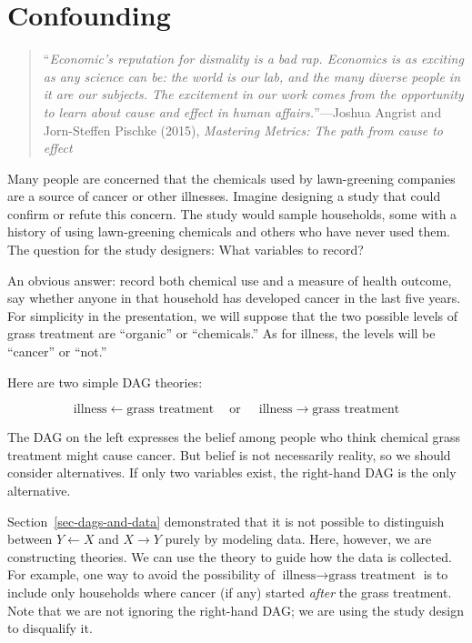 \documentclass[
  letterpaper,
  DIV=11,
  numbers=noendperiod,
  oneside]{scrartcl}
\begin{document}
\newpage

\section{Confounding}\label{sec-confounding}

\begin{quote}
``\emph{Economic's reputation for dismality is a bad rap. Economics is
as exciting as any science can be: the world is our lab, and the many
diverse people in it are our subjects. The excitement in our work comes
from the opportunity to learn about cause and effect in human
affairs.}''---Joshua Angrist and Jorn-Steffen Pischke (2015),
\emph{Mastering Metrics: The path from cause to effect}
\end{quote}

Many people are concerned that the chemicals used by lawn-greening
companies are a source of cancer or other illnesses. Imagine designing a
study that could confirm or refute this concern. The study would sample
households, some with a history of using lawn-greening chemicals and
others who have never used them. The question for the study designers:
What variables to record?

An obvious answer: record both chemical use and a measure of health
outcome, say whether anyone in that household has developed cancer in
the last five years. For simplicity in the presentation, we will suppose
that the two possible levels of grass treatment are ``organic'' or
``chemicals.'' As for illness, the levels will be ``cancer'' or ``not.''

Here are two simple DAG theories:

\[\text{illness} \leftarrow \text{grass treatment}\ \ \ \ \text{ or   }\ \ \ \ \ \text{illness} \rightarrow \text{grass treatment}\]

The DAG on the left expresses the belief among people who think chemical
grass treatment might cause cancer. But belief is not necessarily
reality, so we should consider alternatives. If only two variables
exist, the right-hand DAG is the only alternative.

Section~\ref{sec-dags-and-data} demonstrated that it is not possible to
distinguish between \(Y \leftarrow X\) and \(X \rightarrow Y\) purely by
modeling data. Here, however, we are constructing theories. We can use
the theory to guide how the data is collected. For example, one way to
avoid the possibility of
\(\text{illness} \rightarrow \text{grass treatment}\) is to include only
households where cancer (if any) started \emph{after} the grass
treatment. Note that we are not ignoring the right-hand DAG; we are
using the study design to disqualify it.
\end{document}
